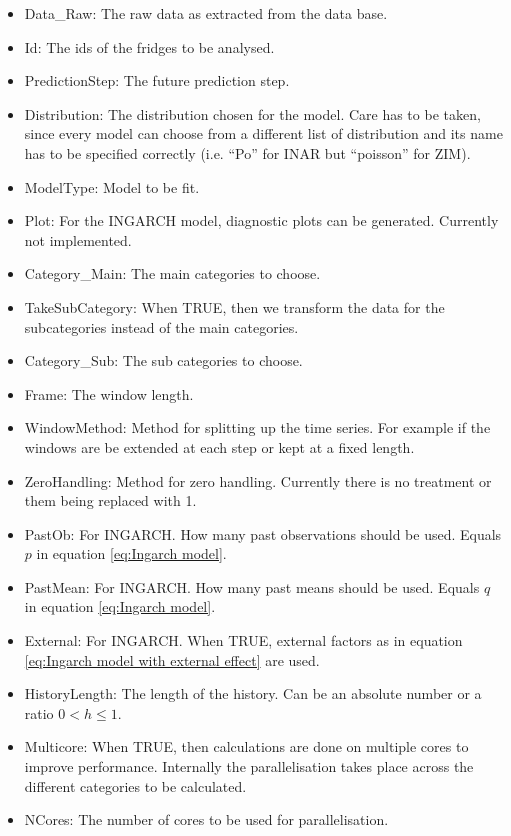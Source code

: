 \begin{itemize}
	\item Data\_Raw: The raw data as extracted from the data base.
  \item Id: The ids of the fridges to be analysed.
  \item PredictionStep: The future prediction step.
  \item Distribution: The distribution chosen for the model. Care has to be taken, since every model can choose from a different list of distribution and its name has to be specified correctly (i.e. "`Po"' for INAR but "`poisson"' for ZIM).
  \item ModelType: Model to be fit. 
  \item Plot: For the INGARCH model, diagnostic plots can be generated. Currently not implemented.
  \item Category\_Main: The main categories to choose. 
  \item TakeSubCategory: When TRUE, then we transform the data for the subcategories instead of the main categories. 
  \item Category\_Sub: The sub categories to choose.
  \item Frame: The window length.
  \item WindowMethod: Method for splitting up the time series. For example if the windows are be extended at each step or kept at a fixed length.
  \item ZeroHandling: Method for zero handling. Currently there is no treatment or them being replaced with 1. 
  \item PastOb: For INGARCH. How many past observations should be used. Equals $p$ in equation \ref{eq:Ingarch model}.
  \item PastMean: For INGARCH. How many past means should be used. Equals $q$ in equation \ref{eq:Ingarch model}.
  \item External: For INGARCH. When TRUE, external factors as in equation \ref{eq:Ingarch model with external effect} are used.
  \item HistoryLength: The length of the history. Can be an absolute number or a ratio $0<h\leq 1$.
  \item Multicore: When TRUE, then calculations are done on multiple cores to improve performance. Internally the parallelisation takes place across the different categories to be calculated. 
  \item NCores: The number of cores to be used for parallelisation. 
\end{itemize}

